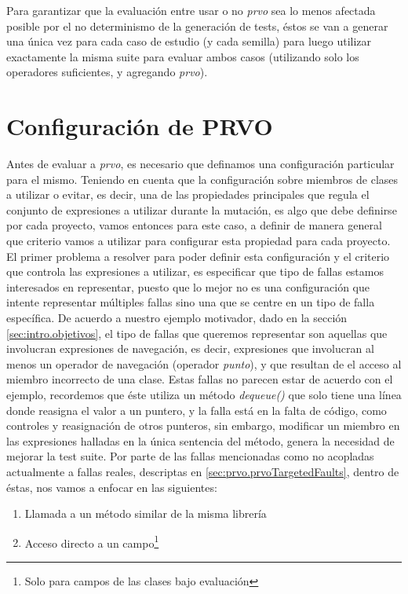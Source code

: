 Para garantizar que la evaluaci\'on entre usar o no \emph{prvo} sea lo menos afectada posible por el no determinismo de la generaci\'on de tests, \'estos se van a generar una \'unica vez para cada caso de estudio (y cada semilla) para luego utilizar exactamente la misma suite para evaluar ambos casos (utilizando solo los operadores suficientes, y agregando \emph{prvo}).

\section{Configuraci\'on de PRVO}
\label{sec:evaluation.prvoconfig}

Antes de evaluar a \emph{prvo}, es necesario que definamos una configuraci\'on particular para el mismo. Teniendo en cuenta que la configuraci\'on sobre miembros de clases a utilizar o evitar, es decir, una de las propiedades principales que regula el conjunto de expresiones a utilizar durante la mutaci\'on, es algo que debe definirse por cada proyecto, vamos entonces para este caso, a definir de manera general que criterio vamos a utilizar para configurar esta propiedad para cada proyecto. El primer problema a resolver para poder definir esta configuraci\'on y el criterio que controla las expresiones a utilizar, es especificar que tipo de fallas estamos interesados en representar, puesto que lo mejor no es una configuraci\'on que intente representar m\'ultiples fallas sino una que se centre en un tipo de falla espec\'ifica. De acuerdo a nuestro ejemplo motivador, dado en la secci\'on \ref{sec:intro.objetivos}, el tipo de fallas que queremos representar son aquellas que involucran expresiones de navegaci\'on, es decir, expresiones que involucran al menos un operador de navegaci\'on (operador \emph{punto}), y que resultan de el acceso al miembro incorrecto de una clase. Estas fallas no parecen estar de acuerdo con el ejemplo, recordemos que \'este utiliza un m\'etodo \emph{dequeue()} que solo tiene una l\'inea donde reasigna el valor a un puntero, y la falla est\'a en la falta de c\'odigo, como controles y reasignaci\'on de otros punteros, sin embargo, modificar un miembro en las expresiones halladas en la \'unica sentencia del m\'etodo, genera la necesidad de mejorar la test suite. Por parte de las fallas mencionadas como no acopladas actualmente a fallas reales, descriptas en \ref{sec:prvo.prvoTargetedFaults}, dentro de \'estas, nos vamos a enfocar en las siguientes:

\begin{enumerate}[label=\arabic*), leftmargin=.75cm,align=left]
	\item Llamada a un m\'etodo similar de la misma librer\'ia
	\item Acceso directo a un campo\footnote{Solo para campos de las clases bajo evaluaci\'on}
\end{enumerate}

